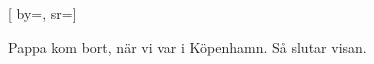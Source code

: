 
[
	by={},
	sr={}]

\beginverse*
Pappa kom bort,
när vi var i Köpenhamn.
Så slutar visan.
\endverse
\endsong
